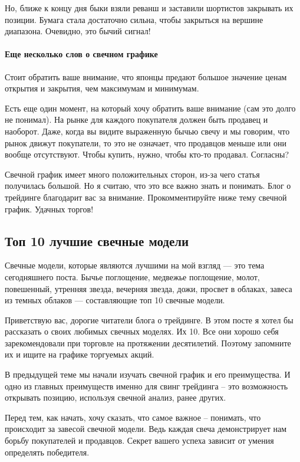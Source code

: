 \documentclass{book}
\begin{document}
Но, ближе к концу дня быки взяли реванш и заставили шортистов
закрывать их позиции. Бумага стала достаточно сильна, чтобы закрыться
на вершине диапазона. Очевидно, это бычий сигнал!

\paragraph{Еще несколько слов о свечном графике}

Стоит обратить ваше внимание, что японцы предают большое значение ценам открытия и закрытия, чем максимумам и минимумам.

Есть еще один момент, на который хочу обратить ваше внимание (сам это долго не понимал). На рынке для каждого покупателя должен быть продавец и наоборот. Даже, когда вы видите выраженную бычью свечу и мы говорим, что рынок движут покупатели, то это не означает, что продавцов меньше или они вообще отсутствуют. Чтобы купить, нужно, чтобы кто-то продавал. Согласны?

Свечной график имеет много положительных сторон, из-за чего статья получилась большой. Но я считаю, что это все важно знать и понимать. Блог о трейдинге благодарит вас за внимание. Прокомментируйте ниже тему свечной график. Удачных торгов!


\subsection{Топ 10 лучшие свечные модели}

Свечные модели, которые являются лучшими на мой взгляд — это тема сегодняшнего поста. Бычье поглощение, медвежье поглощение, молот, повешенный, утренняя звезда, вечерняя звезда, дожи, просвет в облаках, завеса из темных облаков — составляющие топ 10 свечные модели.

Приветствую вас, дорогие читатели блога о трейдинге. В этом посте я хотел бы рассказать о своих любимых свечных моделях. Их 10. Все они хорошо себя зарекомендовали при торговле на протяжении десятилетий. Поэтому запомните их и ищите на графике торгуемых акций.

В предыдущей теме мы начали изучать свечной график и его преимущества. И одно из главных преимуществ именно для свинг трейдинга – это возможность открывать позицию, используя свечной анализ, ранее других.

Перед тем, как начать, хочу сказать, что самое важное – понимать, что происходит за завесой свечной модели. Ведь каждая свеча демонстрирует нам борьбу покупателей и продавцов. Секрет вашего успеха зависит от умения определять победителя.
\end{document}
